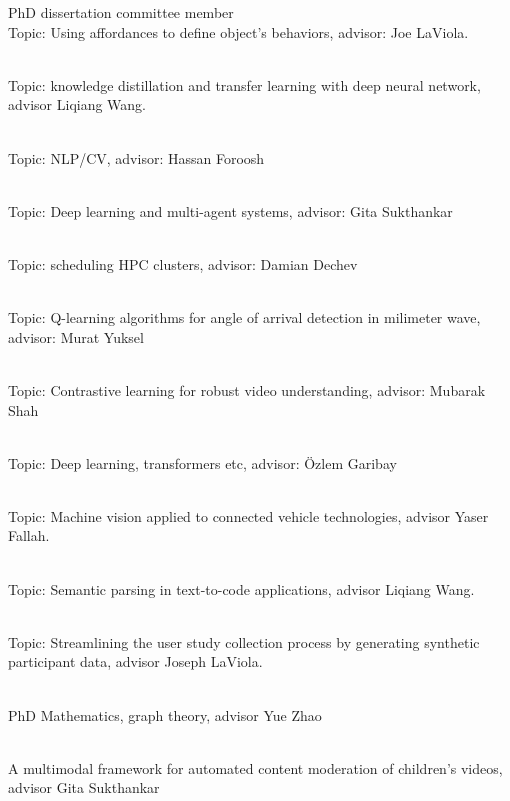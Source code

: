 \begin{category}{PhD dissertation committee member}
 \\
Topic: Using affordances to define object's behaviors, advisor: Joe LaViola.

 \\
Topic: knowledge distillation and transfer learning with deep neural network, advisor Liqiang Wang.

 \\
Topic: NLP/CV, advisor: Hassan Foroosh 

 \\
Topic: Deep learning and multi-agent systems, advisor: Gita Sukthankar 

 \\
Topic: scheduling HPC clusters, advisor: Damian Dechev

 \\
Topic: Q-learning algorithms for angle of arrival detection in milimeter wave, advisor: Murat Yuksel

\\
Topic: Contrastive learning for robust video understanding, advisor: Mubarak Shah

 \\
Topic: Deep learning, transformers etc, advisor: Özlem Garibay 

 \\
Topic: Machine vision applied to connected vehicle technologies, advisor Yaser Fallah.

 \\
Topic: Semantic parsing in text-to-code applications, advisor Liqiang Wang.

 \\
Topic: Streamlining the user study collection process by generating synthetic participant data, advisor Joseph LaViola. 

 \\
PhD Mathematics, graph theory, advisor Yue Zhao 

 \\
A multimodal framework for automated content moderation of children's videos, advisor Gita Sukthankar


\end{category}

